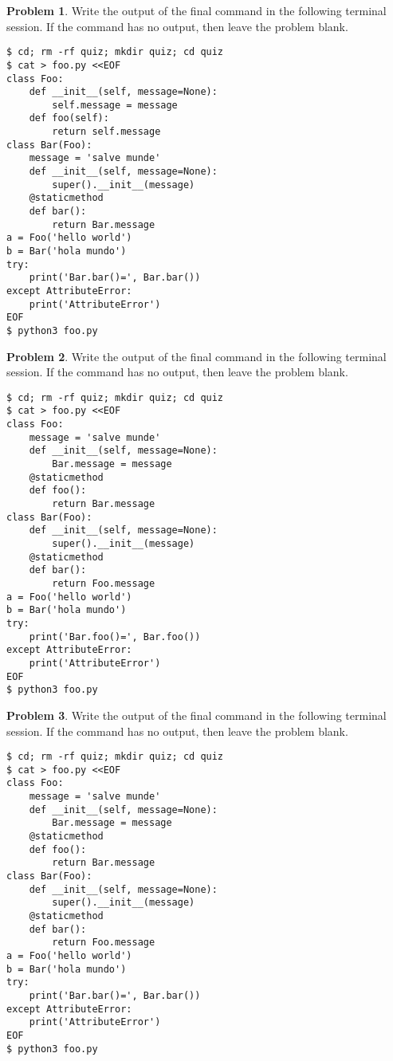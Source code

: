 \documentclass[10pt]{article}
\theoremstyle{definition}
\newtheorem{problem}{Problem}
\begin{document}
\filbreak
\begin{problem}
    Write the output of the final command in the following terminal session.
    If the command has no output, then leave the problem blank.
\end{problem}
\begin{lstlisting}
$ cd; rm -rf quiz; mkdir quiz; cd quiz
$ cat > foo.py <<EOF
class Foo:
    def __init__(self, message=None):
        self.message = message
    def foo(self):
        return self.message
class Bar(Foo):
    message = 'salve munde'
    def __init__(self, message=None):
        super().__init__(message)
    @staticmethod
    def bar():
        return Bar.message
a = Foo('hello world')
b = Bar('hola mundo')
try:
    print('Bar.bar()=', Bar.bar())
except AttributeError:
    print('AttributeError') 
EOF
$ python3 foo.py
\end{lstlisting}


\filbreak
\begin{problem}
    Write the output of the final command in the following terminal session.
    If the command has no output, then leave the problem blank.
\end{problem}
\begin{lstlisting}
$ cd; rm -rf quiz; mkdir quiz; cd quiz
$ cat > foo.py <<EOF
class Foo:
    message = 'salve munde'
    def __init__(self, message=None):
        Bar.message = message
    @staticmethod
    def foo():
        return Bar.message
class Bar(Foo):
    def __init__(self, message=None):
        super().__init__(message)
    @staticmethod
    def bar():
        return Foo.message
a = Foo('hello world')
b = Bar('hola mundo')
try:
    print('Bar.foo()=', Bar.foo())
except AttributeError:
    print('AttributeError') 
EOF
$ python3 foo.py
\end{lstlisting}


\filbreak
\begin{problem}
    Write the output of the final command in the following terminal session.
    If the command has no output, then leave the problem blank.
\end{problem}
\begin{lstlisting}
$ cd; rm -rf quiz; mkdir quiz; cd quiz
$ cat > foo.py <<EOF
class Foo:
    message = 'salve munde'
    def __init__(self, message=None):
        Bar.message = message
    @staticmethod
    def foo():
        return Bar.message
class Bar(Foo):
    def __init__(self, message=None):
        super().__init__(message)
    @staticmethod
    def bar():
        return Foo.message
a = Foo('hello world')
b = Bar('hola mundo')
try:
    print('Bar.bar()=', Bar.bar())
except AttributeError:
    print('AttributeError') 
EOF
$ python3 foo.py
\end{lstlisting}

\end{document}

